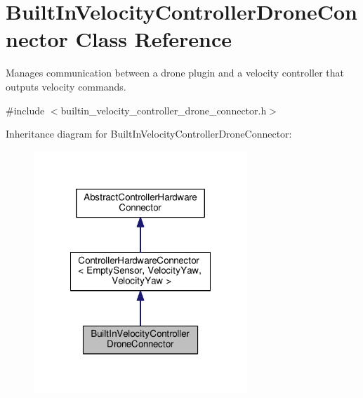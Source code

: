 \hypertarget{classBuiltInVelocityControllerDroneConnector}{\section{Built\-In\-Velocity\-Controller\-Drone\-Connector Class Reference}
\label{classBuiltInVelocityControllerDroneConnector}
}


Manages communication between a drone plugin and a velocity controller that outputs velocity commands.  




{\ttfamily \#include $<$builtin\-\_\-velocity\-\_\-controller\-\_\-drone\-\_\-connector.\-h$>$}



Inheritance diagram for Built\-In\-Velocity\-Controller\-Drone\-Connector\-:\nopagebreak
\begin{figure}[H]
\begin{center}
\leavevmode
\includegraphics[width=228pt]{classBuiltInVelocityControllerDroneConnector__inherit__graph}
\end{center}
\end{figure}


